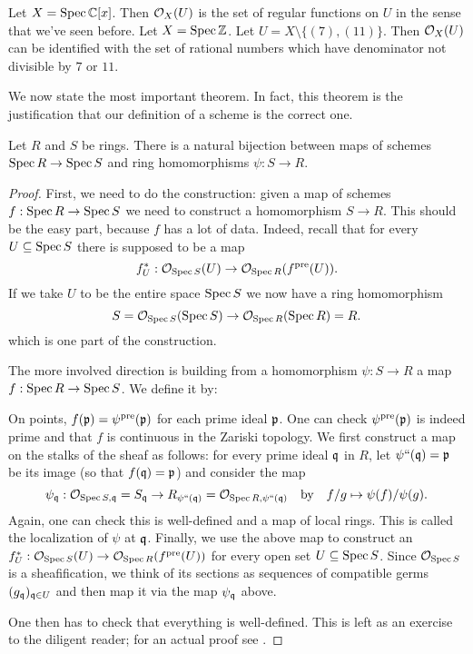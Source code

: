 \begin{example}
	\listhack
	\begin{enumerate}[(a)]
		\ii Let $X = \operatorname{Spec} \mathbb C[x]$.
		Then $\mathcal O_X(U)$ is the set of regular functions on $U$
		in the sense that we've seen before.
		\ii Let $X = \operatorname{Spec} \mathbb Z$.
		Let $U = X \setminus \{ (7), (11) \}$.
		Then $\mathcal O_X(U)$ can be identified with the set of rational numbers
		which have denominator not divisible by $7$ or $11$.
	\end{enumerate}
\end{example}

We now state the most important theorem.
In fact, this theorem is the justification that our definition
of a scheme is the correct one.
\begin{theorem}
	Let $R$ and $S$ be rings.
	There is a natural bijection between maps of schemes $\operatorname{Spec} R \to \operatorname{Spec} S$	
	and ring homomorphisms $\psi : S \to R$.
\end{theorem}
\begin{proof}
	First, we need to do the construction:
	given a map of schemes $f : \operatorname{Spec} R \to \operatorname{Spec} S$ 
	we need to construct a homomorphism $S \to R$.
	This should be the easy part, because $f$ has a lot of data.
	Indeed, recall that for every $U \subseteq \operatorname{Spec} S$
	there is supposed to be a map
	\[ f^\ast_U : \mathcal O_{\operatorname{Spec} S} (U) \to \mathcal O_{\operatorname{Spec} R}(f^{\text{pre}}(U)). \]
	If we take $U$ to be the entire space $\operatorname{Spec} S$ we now have a ring homomorphism
	\[ S = \mathcal O_{\operatorname{Spec} S} (\operatorname{Spec} S) \to \mathcal O_{\operatorname{Spec} R} (\operatorname{Spec} R) = R. \]
	which is one part of the construction.

	The more involved direction is building from a homomorphism
	$\psi : S \to R$ a map $f : \operatorname{Spec} R \to \operatorname{Spec} S$.
	We define it by:
	\begin{itemize}
		\ii On points, $f(\mathfrak p) = \psi^{\text{pre}}(\mathfrak p)$ for each prime ideal $\mathfrak p$.
		One can check $\psi^{\text{pre}}(\mathfrak p)$ is indeed prime
		and that $f$ is continuous in the Zariski topology.
		\ii We first construct a map on the stalks of the sheaf as follows:
		for every prime ideal $\mathfrak q$ in $R$, let $\psi``(\mathfrak q) = \mathfrak p$ be its image
		(so that $f(\mathfrak q) = \mathfrak p$) and consider the map
		\[ \psi_\mathfrak q : \mathcal O_{\operatorname{Spec} S, \mathfrak q} = S_{\mathfrak q}
			\to R_{\psi``(\mathfrak q)} = \mathcal O_{\operatorname{Spec} R, \psi``(\mathfrak q)}
			\quad\text{by}\quad f/g \mapsto \psi(f)/\psi(g). \]
		Again, one can check this is well-defined and a map of local rings.
		This is called the localization of $\psi$ at $\mathfrak q$.
		\ii Finally, we use the above map to construct an
		$f^\ast_U : \mathcal O_{\operatorname{Spec} S}(U) \to \mathcal O_{\operatorname{Spec} R}(f^{\text{pre}}(U))$
		for every open set  $U \subseteq \operatorname{Spec} S$.
		Since $\mathcal O_{\operatorname{Spec} S}$ is a sheafification, we think of its
		sections as sequences of compatible germs $(g_\mathfrak q)_{\mathfrak q \in U}$
		and then map it via the map $\psi_\mathfrak q$ above.
	\end{itemize}
	One then has to check that everything is well-defined.
	This is left as an exercise to the diligent reader;
	for an actual proof see \cite[Proposition 6.3.2]{ref:vakil}.
\end{proof}
